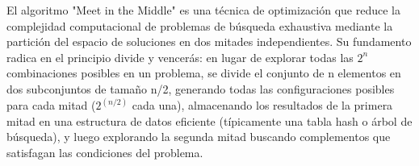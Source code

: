 \markdownRendererDocumentBegin
{}\markdownRendererSectionBegin
{}\markdownRendererInterblockSeparator
{}El algoritmo "Meet in the Middle" es una técnica de optimización que reduce la complejidad computacional de problemas de búsqueda exhaustiva mediante la partición del espacio de soluciones en dos mitades independientes. Su fundamento radica en el principio divide y vencerás: en lugar de explorar todas las $2^n$ combinaciones posibles en un problema, se divide el conjunto de n elementos en dos subconjuntos de tamaño n/2, generando todas las configuraciones posibles para cada mitad ($2^(n/2)$ cada una), almacenando los resultados de la primera mitad en una estructura de datos eficiente (típicamente una tabla hash o árbol de búsqueda), y luego explorando la segunda mitad buscando complementos que satisfagan las condiciones del problema.\markdownRendererInterblockSeparator
{}
\markdownRendererSectionEnd \markdownRendererDocumentEnd
